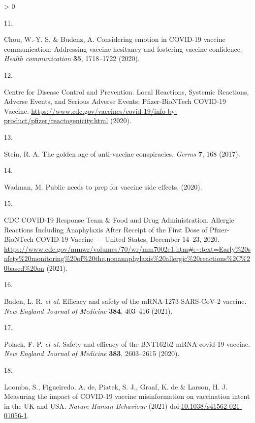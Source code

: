 \documentclass[
  12pt,
]{article}
\newlength{\cslhangindent}
\newlength{\csllabelwidth}
\newenvironment{CSLReferences}[2] %
 {%
  \setlength{\parindent}{0pt}
  \ifodd #1 \everypar{\setlength{\hangindent}{\cslhangindent}}\ignorespaces\fi
  \ifnum #2 > 0
  \setlength{\parskip}{#2\baselineskip}
  \fi
 }%
 {}
\newcommand{\CSLLeftMargin}[1]{\parbox[t]{\csllabelwidth}{#1}}
\newcommand{\CSLRightInline}[1]{\parbox[t]{\linewidth - \csllabelwidth}{#1}\break}
\begin{document}
\begin{CSLReferences}{0}{0}
\leavevmode\hypertarget{ref-chou2020considering}{}%
\CSLLeftMargin{11. }
\CSLRightInline{Chou, W.-Y. S. \& Budenz, A. Considering emotion in COVID-19 vaccine communication: Addressing vaccine hesitancy and fostering vaccine confidence. \emph{Health communication} \textbf{35}, 1718--1722 (2020).}

\leavevmode\hypertarget{ref-cdcadverse}{}%
\CSLLeftMargin{12. }
\CSLRightInline{Centre for Disease Control and Prevention. {Local Reactions, Systemic Reactions, Adverse Events, and Serious Adverse Events: Pfizer-BioNTech COVID-19 Vaccine}. \url{https://www.cdc.gov/vaccines/covid-19/info-by-product/pfizer/reactogenicity.html} (2020).}

\leavevmode\hypertarget{ref-stein2017golden}{}%
\CSLLeftMargin{13. }
\CSLRightInline{Stein, R. A. The golden age of anti-vaccine conspiracies. \emph{Germs} \textbf{7}, 168 (2017).}

\leavevmode\hypertarget{ref-wadman2020public}{}%
\CSLLeftMargin{14. }
\CSLRightInline{Wadman, M. Public needs to prep for vaccine side effects. (2020).}

\leavevmode\hypertarget{ref-cdcallergies}{}%
\CSLLeftMargin{15. }
\CSLRightInline{CDC COVID-19 Response Team \& Food and Drug Administration. {Allergic Reactions Including Anaphylaxis After Receipt of the First Dose of Pfizer-BioNTech COVID-19 Vaccine --- United States, December 14--23, 2020}. \url{https://www.cdc.gov/mmwr/volumes/70/wr/mm7002e1.htm\#:~:text=Early\%20safety\%20monitoring\%20of\%20the,nonanaphylaxis\%20allergic\%20reactions\%2C\%20based\%20on} (2021).}

\leavevmode\hypertarget{ref-baden2021efficacy}{}%
\CSLLeftMargin{16. }
\CSLRightInline{Baden, L. R. \emph{et al.} Efficacy and safety of the mRNA-1273 SARS-CoV-2 vaccine. \emph{New England Journal of Medicine} \textbf{384}, 403--416 (2021).}

\leavevmode\hypertarget{ref-polack2020safety}{}%
\CSLLeftMargin{17. }
\CSLRightInline{Polack, F. P. \emph{et al.} Safety and efficacy of the BNT162b2 mRNA covid-19 vaccine. \emph{New England Journal of Medicine} \textbf{383}, 2603--2615 (2020).}

\leavevmode\hypertarget{ref-loomba_measuring_2021}{}%
\CSLLeftMargin{18. }
\CSLRightInline{Loomba, S., Figueiredo, A. de, Piatek, S. J., Graaf, K. de \& Larson, H. J. Measuring the impact of {COVID}-19 vaccine misinformation on vaccination intent in the {UK} and {USA}. \emph{Nature Human Behaviour} (2021) doi:\href{https://doi.org/10.1038/s41562-021-01056-1}{10.1038/s41562-021-01056-1}.}


\end{CSLReferences}
\end{document}
